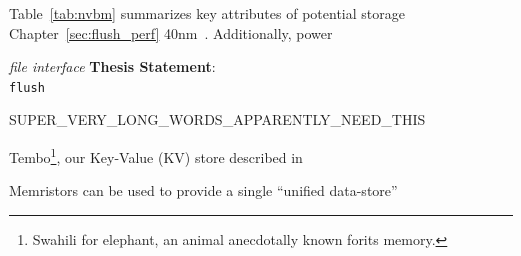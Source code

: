 
Table~\ref{tab:nvbm} summarizes key attributes of potential storage
Chapter~\ref{sec:flush_perf} 
40nm~\citep{ITRS07,Mandelman02,Mueller05}.  Additionally, power


\textit{file interface}
\textbf{Thesis Statement}:
\\
\texttt{flush}


\begin{sloppypar}
SUPER_VERY_LONG_WORDS_APPARENTLY_NEED_THIS
\end{sloppypar}


Tembo\footnote{Swahili for elephant, an animal anecdotally known forits memory.}, our Key-Value (KV) store described in


Memristors can be used to provide a single ``unified data-store''

